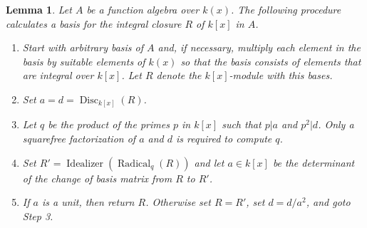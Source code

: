 \documentclass[12pt,reqno]{amsart}
\numberwithin{equation}{section}
\newtheorem{lemma}[theorem]{Lemma}
\newcommand{\op}[1]  { \operatorname{ #1 }}
\begin{document}
\begin{lemma}
\label{lemma_intbasis2}
 Let $A$ be a function algebra over $k(x)$. The following procedure calculates a basis for the integral closure $R$ of $k[x]$ in $A$.

\begin{enumerate}
 \item[Step 1] Start with arbitrary basis of $A$ and, if necessary, multiply each element in the basis by suitable elements of $k(x)$ so that the basis consists of elements that are integral over $k[x]$. Let $R$ denote the $k[x]$-module with this bases.
\item[Step 2] Set $a=d=\op{Disc}_{k[x]}(R)$.
\item[Step 3] Let $q$ be the product of the primes $p$ in $k[x]$ such that $p|a$ and $p^2|d$. Only a squarefree factorization of $a$ and $d$ is required to compute $q$.
\item[Step 4] Set $R'=\op{Idealizer}(\op{Radical}_{q}(R))$ and let $a \in k[x]$ be the determinant of the change of basis matrix from $R$ to $R'$.
\item[Step 5] If $a$ is a unit, then return $R$. Otherwise set $R=R'$, set $d=d/a^2$, and goto Step 3.
\end{enumerate}
\end{lemma}
\end{document}
